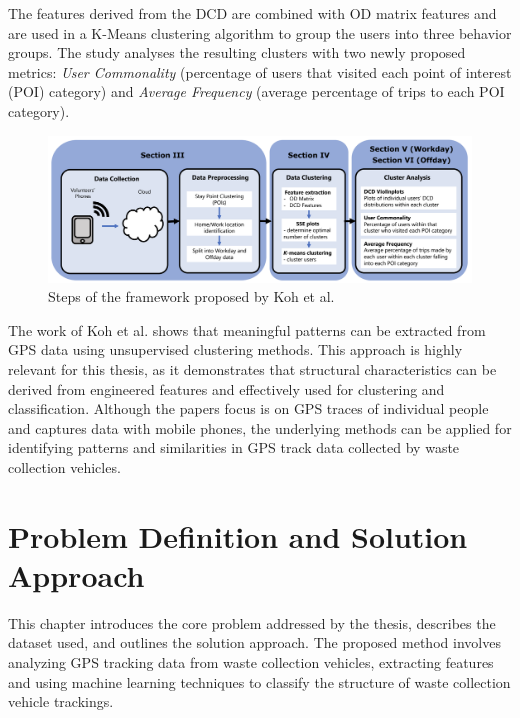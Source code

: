 \documentclass[a4paper,12pt,twoside]{scrreprt}
\begin{document}
The features derived from the DCD are combined with OD matrix
features
and are used in a K-Means clustering algorithm to group the users into three
behavior groups. The study analyses the resulting clusters with two newly
proposed
metrics: \textit{User Commonality} (percentage of users that visited each
point of interest (POI) category) and \textit{Average Frequency} (average
percentage of trips to each POI category).~\cite{koh_clustering_2022}

\begin{figure}[htbp]
  \centering

  \includegraphics[width=\textwidth]{Figures/related_work/koh_clustering_framwork_flowchart.png}
  \caption{Steps of the framework proposed by Koh et
    al.~\cite{koh_clustering_2022}}
  \label{fig:koh_clustering_framework}
\end{figure}
\FloatBarrier

The work of Koh et al. shows that meaningful patterns can be extracted from GPS
data using unsupervised clustering methods. This approach is highly relevant
for this thesis,
as it demonstrates that structural characteristics can be derived from
engineered features
and effectively used for clustering and classification. Although the papers
focus is on
GPS traces of individual people and captures data with mobile phones, the
underlying methods can
be applied for identifying patterns and similarities in GPS track data
collected by
waste collection vehicles.

\chapter{Problem Definition and Solution Approach}
This chapter introduces the core problem addressed by the thesis, describes the
dataset used, and outlines the solution approach. The proposed method involves
analyzing GPS tracking data from waste collection vehicles, extracting features
and using machine
learning techniques to classify the structure of waste collection vehicle
trackings.
\end{document}

